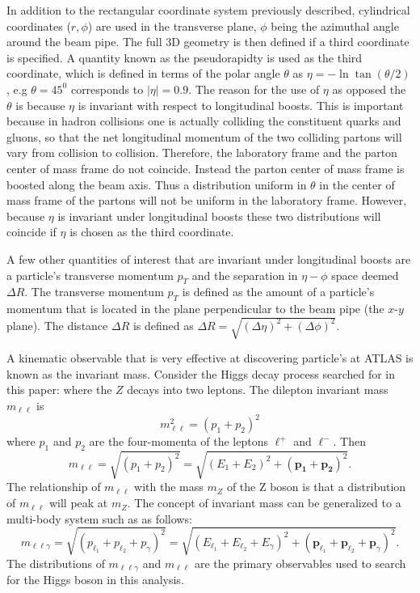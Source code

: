 In addition to the rectangular coordinate system previously described,
cylindrical coordinates ($r, \phi$) are
used in the transverse plane, $\phi$ being the azimuthal angle around the
beam pipe. The full 3D geometry is then defined if a third coordinate is specified.
A quantity known as the pseudorapidty is used as the third coordinate, 
which is defined in terms of the 
polar angle $\theta$ as $\eta = -\ln \tan(\theta/2)$, e.g $\theta = 45^0$
corresponds to $|\eta| = 0.9$. The reason for the use of $\eta$ as opposed
the $\theta$ is because $\eta$ is invariant with respect to longitudinal boosts. This
is important because in hadron collisions one is actually colliding the
constituent quarks and gluons, so that the net longitudinal momentum of the two
colliding partons will vary from collision to collision. Therefore, the laboratory
frame and the parton center of mass frame do not coincide. Instead the parton
center of mass frame is boosted along the beam axis. Thus a distribution
uniform in $\theta$ in the center of mass frame of the partons will not
be uniform in the laboratory frame. However, because $\eta$ is invariant
under longitudinal boosts these two distributions will coincide if $\eta$
is chosen as the third coordinate.

A few other quantities of interest that are invariant under longitudinal boosts
are a particle's transverse momentum $p_T$ and the separation in $\eta-\phi$
space deemed $\Delta R$. The transverse momentum $p_T$ is defined as the 
amount of a particle's momentum that is located in the plane perpendicular 
to the beam pipe (the $x$-$y$ plane). The distance $\Delta R$ 
is defined as $\Delta R = \sqrt{(\Delta \eta)^2 + (\Delta \phi)^2}$.

A kinematic observable that is very effective at discovering particle's at
ATLAS is known as the invariant mass. Consider the Higgs decay process
searched for in this paper: \HTollg where the $Z$ decays into two leptons.
The dilepton invariant mass $m_{\ell\ell}$ is
\[
    m^2_{\ell\ell} = (p_1 + p_2)^2
\]
where $p_1$ and $p_2$ are the four-momenta of the leptons $\ell^+$ and $\ell^-$.
Then
\[
    m_{\ell\ell} = \sqrt{(p_1 + p_2)^2} = \sqrt{(E_1 + E_2)^2 + (\mathbf{p_1} + \mathbf{p_2})^2}.
\]
The relationship of $m_{\ell\ell}$ with the mass $m_Z$ of the Z boson is that a
distribution of $m_{\ell\ell}$ will peak at $m_{Z}$. The concept of invariant
mass can be generalized to a multi-body system such as \HTollg as follows:
\[
    m_{\ell\ell\gamma} = \sqrt{(p_{\ell_1} + p_{\ell_2} + p_{\gamma})^2} =
    \sqrt{(E_{\ell_1} + E_{\ell_2} + E_{\gamma})^2 + (\mathbf{p}_{\ell_1} + 
    \mathbf{p}_{\ell_2} + \mathbf{p}_{\gamma})^2}. 
\]
The distributions of $m_{\ell\ell\gamma}$ and $m_{\ell\ell}$ are the primary
observables used to search for the Higgs boson in this analysis.

